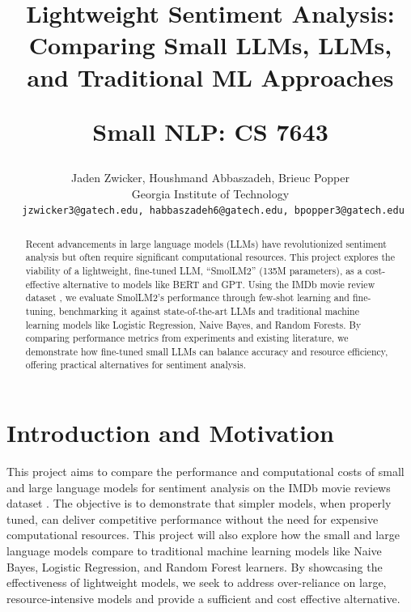 \documentclass[10pt,twocolumn,letterpaper]{article}
\begin{document}
\title{
Lightweight Sentiment Analysis: Comparing Small LLMs, LLMs, and Traditional ML Approaches

Small NLP: CS 7643
}

\author{
Jaden Zwicker, 
Houshmand Abbaszadeh,
Brieuc Popper
\\
Georgia Institute of Technology\\
{\tt\small 
jzwicker3@gatech.edu, 
habbaszadeh6@gatech.edu, 
bpopper3@gatech.edu}
}



\maketitle

\begin{abstract}
Recent advancements in large language models (LLMs) have revolutionized sentiment analysis but often require significant computational resources. This project explores the viability of a lightweight, fine-tuned LLM, “SmolLM2” (135M parameters), as a cost-effective alternative to models like BERT and GPT. Using the IMDb movie review dataset \cite{IMDB-dataset}, we evaluate SmolLM2's performance through few-shot learning and fine-tuning, benchmarking it against state-of-the-art LLMs and traditional machine learning models like Logistic Regression, Naive Bayes, and Random Forests. By comparing performance metrics from experiments and existing literature, we demonstrate how fine-tuned small LLMs can balance accuracy and resource efficiency, offering practical alternatives for sentiment analysis.

\end{abstract}

\section{Introduction and Motivation}
This project aims to compare the performance and computational costs of small and large language models for sentiment analysis on the IMDb movie reviews dataset \cite{IMDB-dataset}. The objective is to demonstrate that simpler models, when properly tuned, can deliver competitive performance without the need for expensive computational resources.  This project will also explore how the small and large language models compare to traditional machine learning models like Naive Bayes, Logistic Regression, and Random Forest learners. By showcasing the effectiveness of lightweight models, we seek to address over-reliance on large, resource-intensive models and provide a sufficient and cost effective alternative. 
\end{document}
